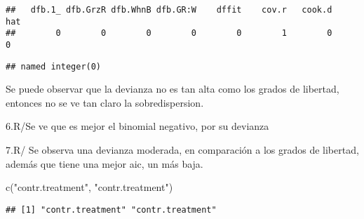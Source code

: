 \documentclass[
]{article}
\newenvironment{Shaded}{\begin{snugshade}}{\end{snugshade}}
\newcommand{\AttributeTok}[1]{\textcolor[rgb]{0.77,0.63,0.00}{#1}}
\newcommand{\DecValTok}[1]{\textcolor[rgb]{0.00,0.00,0.81}{#1}}
\newcommand{\FunctionTok}[1]{\textcolor[rgb]{0.00,0.00,0.00}{#1}}
\newcommand{\NormalTok}[1]{#1}
\newcommand{\OtherTok}[1]{\textcolor[rgb]{0.56,0.35,0.01}{#1}}
\newcommand{\SpecialCharTok}[1]{\textcolor[rgb]{0.00,0.00,0.00}{#1}}
\newcommand{\StringTok}[1]{\textcolor[rgb]{0.31,0.60,0.02}{#1}}
\begin{document}
\begin{verbatim}
##   dfb.1_ dfb.GrzR dfb.WhnB dfb.GR:W    dffit    cov.r   cook.d      hat 
##        0        0        0        0        0        1        0        0
\end{verbatim}

\begin{Shaded}
\end{Shaded}

\begin{verbatim}
## named integer(0)
\end{verbatim}

Se puede observar que la devianza no es tan alta como los grados de
libertad, entonces no se ve tan claro la sobredispersion.

6.R/Se ve que es mejor el binomial negativo, por su devianza

7.R/ Se observa una devianza moderada, en comparación a los grados de
libertad, además que tiene una mejor aic, un más baja.

\begin{Shaded}
\begin{Highlighting}[]
\FunctionTok{c}\NormalTok{(}\StringTok{"contr.treatment"}\NormalTok{, }\StringTok{"contr.treatment"}\NormalTok{)}
\end{Highlighting}
\end{Shaded}

\begin{verbatim}
## [1] "contr.treatment" "contr.treatment"
\end{verbatim}

\begin{Shaded}
\end{Shaded}
\end{document}
